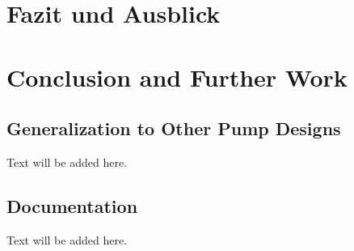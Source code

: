 {\chapter{Fazit und Ausblick}}
{\chapter{Conclusion and Further Work}}

\label{sec:conclusion}

\section{Generalization to Other Pump Designs}
Text will be added here.

\section{Documentation}
Text will be added here.
